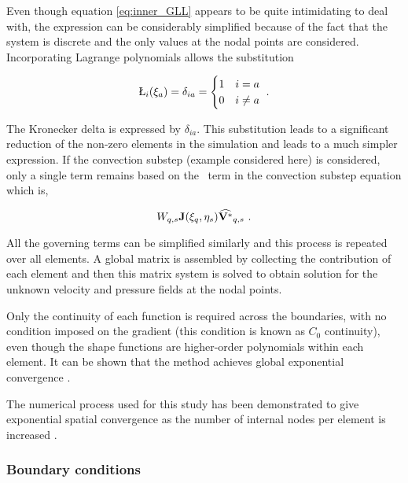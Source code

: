 Even though equation \ref{eq:inner_GLL} appears to be quite intimidating to deal with, the expression can be considerably simplified because of the fact that the system is discrete and the only values at the nodal points are considered. Incorporating Lagrange polynomials allows the substitution 

 \begin{gather}
 \label{eq:kronecker}
 \L_{i}(\compone_{a}) = \delta_{ia} = \begin{cases}
 1 & i = a    \\
 0 & i \neq a \\
 \end{cases} ~.
 \end{gather}
 
 The Kronecker delta is expressed by $\delta_{ia}$. This substitution leads to a significant reduction of the non-zero elements in the simulation and leads to a much simpler expression. If the convection substep (example considered here) is considered, only a single term remains based on the \Vint\ term in the convection substep equation which is,


 \begin{equation} \centering
 W_{q,s}\jacobian(\compone_{q},\comptwo_{s})\widehat{\Vint}_{q,s} ~.
 \end{equation}
 
 
 All the governing terms can be simplified similarly and this process is repeated over all elements. A global matrix is assembled by collecting the contribution of each element and then this matrix system is solved to obtain solution for the unknown velocity and pressure fields at the nodal points. 
 
 Only the continuity of each function is required across the boundaries, with no condition imposed on the gradient (this condition
 is known as $C_{0}$ continuity), even though the shape functions are higher-order polynomials within each element. It can be shown that the method achieves global exponential convergence \citep{karniadakis2005}.  
 
 The numerical process used for this study has been demonstrated to give
 exponential spatial convergence as the number of internal nodes per
 element is increased \citep{Thompson1996a}.
 


\subsubsection{Boundary conditions}

